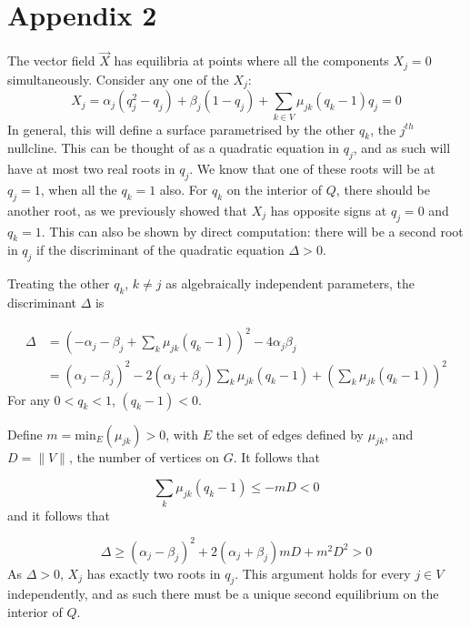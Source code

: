 \documentclass{article}
\begin{document}
\section{Appendix 2}

The vector field $\vec{X}$ has equilibria at points where all the components
$X_j = 0$ simultaneously. Consider any one of the $X_j$:
\begin{equation}
    X_j = \alpha_j (q_j^2 - q_j) + \beta_j (1 - q_j) 
          + \sum_{k \in V} \mu_{jk} (q_k - 1) q_j = 0
\end{equation}
In general, this will define a surface parametrised by the other $q_k$, the
$j^{th}$ nullcline.
This can be thought of as a quadratic equation in $q_j$, and as such will have
at most two real roots in $q_j$. We know that one of these roots will be at $q_j
= 1$, when all the $q_k = 1$ also. For $q_k$ on the interior of $Q$, there
should be another root, as we previously showed that $X_j$ has opposite signs at
$q_j = 0$ and $q_k = 1$. This can also be shown by direct computation: there
will be a second root in $q_j$ if the discriminant of the quadratic equation $\Delta > 0$.

Treating the other $q_k$, $k \neq j$ as algebraically independent parameters,
the discriminant $\Delta$ is

\begin{align}
    \Delta &= (-\alpha_j -\beta_j + \sum_k \mu_{jk} (q_k - 1))^2 - 4\alpha_j \beta_j
    \nonumber \\
    &= (\alpha_j - \beta_j)^2 - 2 (\alpha_j + \beta_j) \sum_k \mu_{jk} (q_k - 1)
    +(\sum_k \mu_{jk} (q_k - 1))^2
\end{align}
For any $0 < q_k < 1$, $(q_k - 1) < 0$.

Define $m = \mathrm{min}_E(\mu_{jk}) > 0$, with $E$ the set of edges defined by
$\mu_{jk}$, and $D = \|V\|$, the number of vertices on $G$. It follows that

\begin{equation}
    \sum_k \mu_{jk} (q_k - 1) \leq - m D < 0
\end{equation}
and it follows that

\begin{equation}
    \Delta \geq (\alpha_j - \beta_j)^2 + 2 (\alpha_j + \beta_j) m D + m^2 D^2 > 0
\end{equation}
As $\Delta > 0$, $X_j$ has exactly two roots in $q_j$. This argument holds for every
$j \in V$ independently, and as such there must be a unique second equilibrium on the
interior of $Q$.
\end{document}
